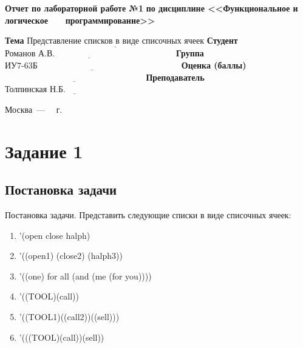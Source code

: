 \documentclass[12pt]{report}
\begin{document}
\begin{titlepage}
		\begin{center}
			\noindent\begin{minipage}{1.1\textwidth}\centering
				\Large\textbf{  Отчет по лабораторной работе №1}\newline
				\textbf{по дисциплине <<Функциональное и логическое}\newline
				\textbf{~~~программирование>>}\newline\newline
			\end{minipage}
		\end{center}
		
		\noindent\textbf{Тема} $\underline{\text{Представление списков в виде списочных ячеек}}$\newline\newline
		\noindent\textbf{Студент} $\underline{\text{Романов А.В.~~~~~~~~~~~~~~~~~~~~~~~~~~~~~~~~~~~~~~~~~~}}$\newline\newline
		\noindent\textbf{Группа} $\underline{\text{ИУ7-63Б~~~~~~~~~~~~~~~~~~~~~~~~~~~~~~~~~~~~~~~~~~~~~~~~~~}}$\newline\newline
		\noindent\textbf{Оценка (баллы)} $\underline{\text{~~~~~~~~~~~~~~~~~~~~~~~~~~~~~~~~~~~~~~~~~~~~~~~~~}}$\newline\newline
		\noindent\textbf{Преподаватель} $\underline{\text{Толпинская Н.Б.~~~~~~~~~~~~~~~~~~~~~~~~~~~~}}$\newline\newline\newline
		
		\begin{center}
			\vfill
			Москва~---~\the\year
			~г.
		\end{center}
	\end{titlepage}
	
	
	
	\chapter*{Задание 1}
	\section*{Постановка задачи}
	
	Постановка задачи. Представить следующие списки в виде списочных ячеек:
	
	
	\begin{enumerate}
		\item ’(open close halph)
		
		\item ’((open1) (close2) (halph3))
		
		\item ’((one) for all (and (me (for you))))
		
		\item ’((TOOL)(call))
		
		\item ’((TOOL1)((call2))((sell)))
		
		\item ’(((TOOL)(call))(sell))
	\end{enumerate}
	
\end{document}
